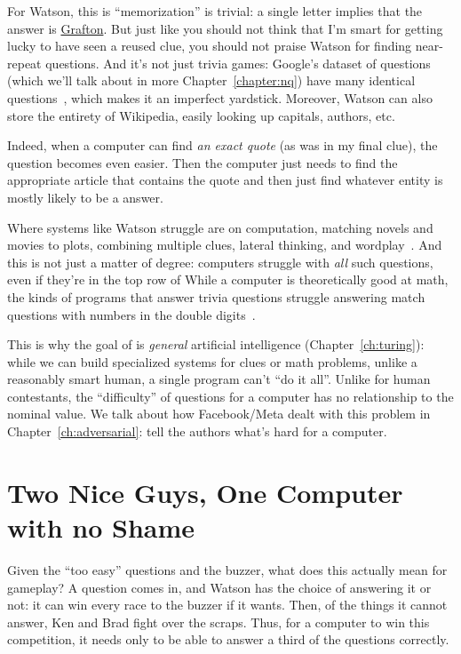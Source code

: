 For Watson, this is ``memorization'' is trivial: a single letter
implies that the answer is \underline{Grafton}.
%
But just like you should not think that I'm smart for getting lucky to
have seen a reused clue, you should not praise Watson for finding
near-repeat questions.
%
And it's not just trivia games: Google's dataset of questions (which
we'll talk about in more Chapter~\ref{chapter:nq}) have
many identical questions~\citep{lewis-21}, which makes it an imperfect yardstick.
%
Moreover, Watson can also store the entirety of Wikipedia, easily
looking up capitals, authors, etc.

Indeed, when a computer can find \emph{an exact quote} (as was in my
final \jeopardy{} clue), the question becomes even easier.
%
Then the computer just needs to find the appropriate article that
contains the quote and then just find whatever entity is mostly likely
to be a \jeopardy{} answer.

Where systems like Watson struggle are on computation, matching novels
and movies to plots, combining multiple clues, lateral thinking, and
wordplay~\citep{kaushik-18}.
%
And this is not just a matter of degree: computers struggle with \emph{all}
such questions, even if they're in the top row of \jeopardyf{}
%
While a computer is theoretically good at math, the kinds of programs
that answer trivia questions struggle answering match questions with
numbers in the double digits~\citep{wallace-19:numbers}.

This is why the goal of  is \emph{general} artificial
intelligence (Chapter~\ref{ch:turing}): while we can build specialized
systems for \jeopardy{} clues or math problems, unlike a
reasonably smart human, a single program can't ``do it all''.
%
Unlike for human contestants, the ``difficulty'' of \jeopardy{}
questions for a computer has no relationship to the nominal value.
%
We talk about how Facebook/Meta dealt with this problem in
Chapter~\ref{ch:adversarial}: tell the authors what's hard for a computer.

\section{Two Nice Guys, One Computer with no Shame}
\label{sec:watson:strategy}


Given the ``too easy'' questions and the buzzer, what does this
actually mean for gameplay?
%
A question comes in, and Watson has the choice of answering it or not:
it can win every race to the buzzer if it wants.
%
Then, of the things it cannot answer, Ken and Brad fight over the
scraps.
%
Thus, for a computer to win this competition, it needs only to be able
to answer a third of the questions correctly.

